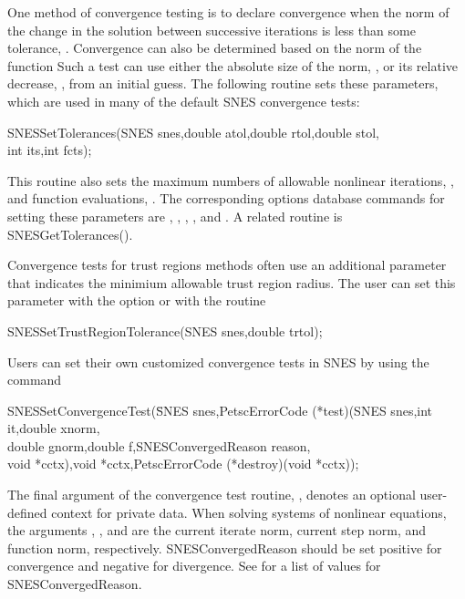 One method of convergence testing is
to declare convergence when the norm of the change in the solution
between successive iterations is less than some tolerance, .
Convergence can also be determined based on the norm of the function
Such a test can use either the absolute size of the
norm, , or its relative decrease, , from an initial
guess.  The following routine sets these parameters, which are used
in many of the default SNES convergence tests:
\begin{tabbing}
  SNESSetTolerances(SNES snes,double atol,double rtol,double stol,\\
          int its,int fcts);
\end{tabbing}
This routine also sets the maximum numbers of allowable
nonlinear iterations, , and function evaluations, .
The corresponding options database commands for setting these parameters
are , , ,
   
 
, and .
A related routine is SNESGetTolerances().

Convergence tests for trust regions methods often use an additional
parameter that indicates the minimium allowable trust region radius.
The user can set this parameter with the option 
 or with the routine
\begin{tabbing}
  SNESSetTrustRegionTolerance(SNES snes,double trtol);
\end{tabbing}

Users can set their own customized convergence tests in SNES by using
the command
\begin{tabbing}
  SNESSetConvergenceTest(\=SNES snes,PetscErrorCode (*test)(SNES snes,int it,double xnorm,\\
                         \>double gnorm,double f,SNESConvergedReason reason,\\
                         \>void *cctx),void *cctx,PetscErrorCode (*destroy)(void *cctx));
\end{tabbing}
The final argument of the convergence test routine, ,
denotes an optional user-defined context for private data.  When
solving systems of nonlinear equations, the arguments ,
, and  are the current iterate norm, current step
norm, and function norm, respectively.
SNESConvergedReason should be set positive
for convergence and negative for divergence. See 
for a list of values for SNESConvergedReason.

